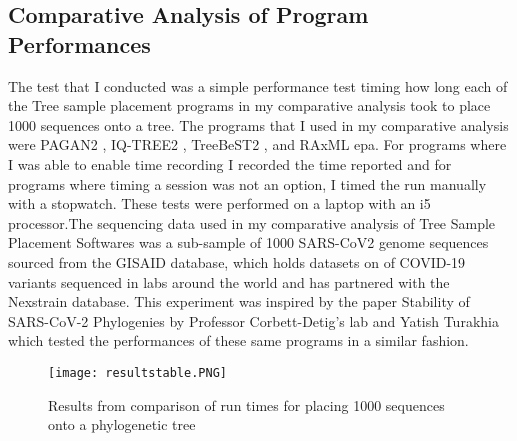 \documentclass[12pt,journal,compsoc]{IEEEtran}
\begin{document}
\subsection{Comparative Analysis of Program Performances}
The test that I conducted was a simple performance test timing how long each of the Tree sample placement programs in my comparative analysis took to place 1000 sequences onto a tree. The programs that I used in my comparative analysis were PAGAN2 , IQ-TREE2 , TreeBeST2 , and RAxML epa. For programs where I was able to enable time recording I recorded the time reported and for programs where timing a session was not an option, I timed the run manually with a stopwatch. These tests were performed on a laptop with an i5 processor.The sequencing data used in my comparative analysis of Tree Sample Placement Softwares was a sub-sample of 1000 SARS-CoV2 genome sequences sourced from the GISAID database, which holds datasets on of COVID-19 variants sequenced in labs around the world and has partnered with the Nexstrain database. This experiment was inspired by the paper Stability of SARS-CoV-2 Phylogenies by Professor Corbett-Detig’s lab and Yatish Turakhia which tested the performances of these same programs in a similar fashion. 

\begin{figure}[H]
    \centering
    \texttt{[image: resultstable.PNG]}
    \caption{ 
    Results from comparison of run times for placing 1000 sequences onto a phylogenetic tree}
\end{figure}
\end{document}
